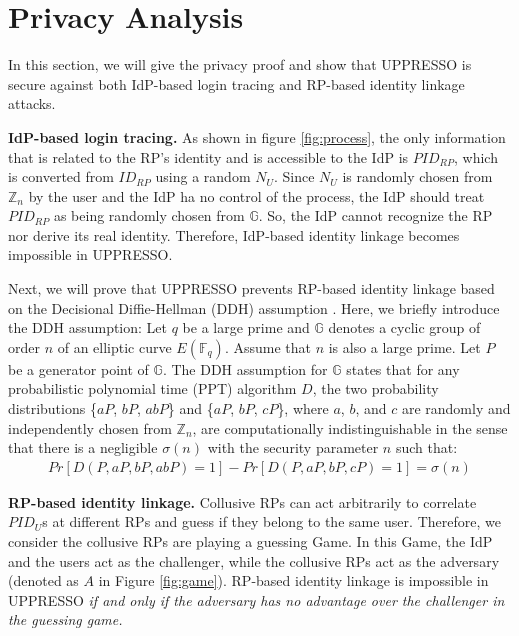 \section{Privacy Analysis}
\label{sec:privacy}


In this section, we will give the privacy proof and show that UPPRESSO is secure against both IdP-based login tracing and RP-based identity linkage attacks.

\noindent\textbf{IdP-based login tracing.}
As shown in figure \ref{fig:process}, the only information that is related to the RP's identity and is accessible to the IdP is $PID_{RP}$, which is converted from $ID_{RP}$ using a random $N_U$. Since $N_U$ is randomly chosen from $\mathbb{Z}_n$ by the user and the IdP ha no control of the process, the IdP should treat $PID_{RP}$ as being randomly chosen from $\mathbb{G}$. So, the IdP cannot recognize the RP nor derive its real identity. Therefore, IdP-based identity linkage becomes impossible in UPPRESSO.

Next, we will prove that UPPRESSO prevents RP-based identity linkage based on the Decisional Diffie-Hellman (DDH) assumption \cite{GoldwasserK16}. Here, we briefly introduce the DDH assumption:
Let $q$ be a large prime and $\mathbb{G}$ denotes a cyclic group of order $n$ of an elliptic curve $E(\mathbb{F}_q)$.
Assume that $n$ is also a large prime. Let $P$ be a generator point of $\mathbb{G}$. The DDH assumption for $\mathbb{G}$ states that for any probabilistic polynomial time (PPT) algorithm $D$, the two probability distributions \{$aP$, $bP$, $abP$\} and \{$aP$, $bP$, $cP$\}, where $a$, $b$, and $c$ are randomly and independently chosen from $\mathbb{Z}_n$, are computationally indistinguishable in the sense that there is a negligible $\sigma(n)$ with the security parameter $n$ such that:
\vspace{-\topsep}
\begin{multline*}
Pr[D(P, aP, bP, abP)=1]-Pr[D(P, aP, bP, cP)=1]=\sigma(n)
\end{multline*}
\vspace{-\topsep}

\vspace{-2mm}
\noindent\textbf{RP-based identity linkage.}
Collusive RPs can act arbitrarily to correlate $PID_U$s at different RPs and guess if they belong to the same user. Therefore, we consider the collusive RPs are playing a guessing Game. In this Game, the IdP and the users act as the challenger, while the collusive RPs act as the adversary (denoted as $A$ in Figure \ref{fig:game}). RP-based identity linkage is impossible in UPPRESSO {\em if and only if the adversary has no advantage over the challenger in the guessing game.}


